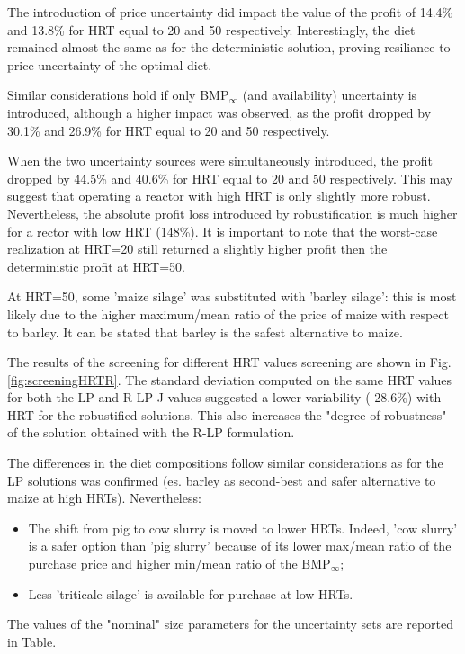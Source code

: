The introduction of price uncertainty did impact the value of the profit of 14.4\% and 13.8\% for HRT equal to 20 and 50 respectively. Interestingly, the diet remained almost the same as for the deterministic solution, proving resiliance to price uncertainty of the optimal diet.

Similar considerations hold if only BMP$_\infty$ (and availability) uncertainty is introduced, although a higher impact was observed, as the profit dropped by 30.1\% and 26.9\% for HRT equal to 20 and 50 respectively.

When the two uncertainty sources were simultaneously introduced, the profit dropped by 44.5\% and 40.6\% for HRT equal to 20 and 50 respectively. This may suggest that operating a reactor with high HRT is only slightly more robust. Nevertheless, the absolute profit loss introduced by robustification is much higher for a rector with low HRT (148\%). 
It is important to note that the worst-case realization at HRT=20 still returned a slightly higher profit then the deterministic profit at HRT=50.

At HRT=50, some 'maize silage' was substituted with 'barley silage': this is most likely due to the higher maximum/mean ratio of the price of maize with respect to barley. It can be stated that barley is the safest alternative to maize.

The results of the screening for different HRT values screening are shown in Fig.\ref{fig:screeningHRTR}.
The standard deviation computed on the same HRT values for both the LP and R-LP J values suggested a lower variability (-28.6\%) with HRT for the robustified solutions. This also increases the "degree of robustness" of the solution obtained with the R-LP formulation. 

The differences in the diet compositions follow similar considerations as for the LP solutions was confirmed (es. barley as second-best and safer alternative to maize at high HRTs).
Nevertheless:
\begin{itemize}
    \item The shift from pig to cow slurry is moved to lower HRTs. Indeed, 'cow slurry' is a safer option than 'pig slurry' because of its lower max/mean ratio of the purchase price and higher min/mean ratio of the BMP$_\infty$;
    \item Less 'triticale silage' is available for purchase at low HRTs.
\end{itemize}

The values of the "nominal" size parameters for the uncertainty sets are reported in Table. 

